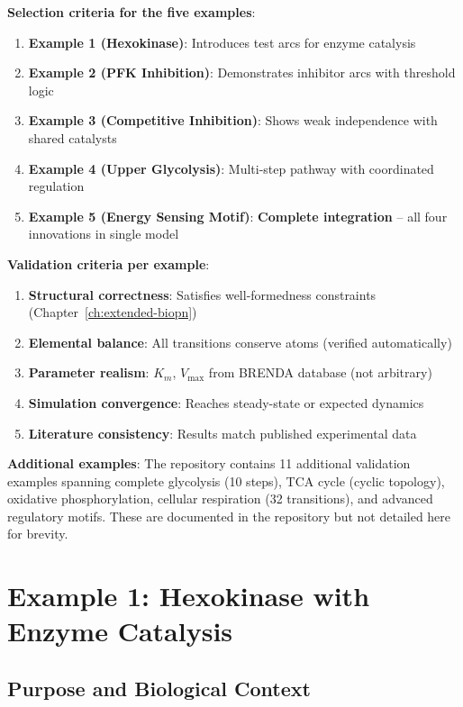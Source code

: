 \textbf{Selection criteria for the five examples}:

\begin{enumerate}
    \item \textbf{Example 1 (Hexokinase)}: Introduces test arcs for enzyme catalysis
    \item \textbf{Example 2 (PFK Inhibition)}: Demonstrates inhibitor arcs with threshold logic
    \item \textbf{Example 3 (Competitive Inhibition)}: Shows weak independence with shared catalysts
    \item \textbf{Example 4 (Upper Glycolysis)}: Multi-step pathway with coordinated regulation
    \item \textbf{Example 5 (Energy Sensing Motif)}: \textbf{Complete integration} -- all four innovations in single model
\end{enumerate}

\textbf{Validation criteria per example}:

\begin{enumerate}
    \item \textbf{Structural correctness}: Satisfies well-formedness constraints (Chapter~\ref{ch:extended-biopn})
    \item \textbf{Elemental balance}: All transitions conserve atoms (verified automatically)
    \item \textbf{Parameter realism}: $K_m$, $V_{\max}$ from BRENDA database (not arbitrary)
    \item \textbf{Simulation convergence}: Reaches steady-state or expected dynamics
    \item \textbf{Literature consistency}: Results match published experimental data
\end{enumerate}

\textbf{Additional examples}: The repository contains 11 additional validation examples spanning complete glycolysis (10 steps), TCA cycle (cyclic topology), oxidative phosphorylation, cellular respiration (32 transitions), and advanced regulatory motifs. These are documented in the repository but not detailed here for brevity.

\section{Example 1: Hexokinase with Enzyme Catalysis}
\label{sec:example-hexokinase}

\subsection{Purpose and Biological Context}
\label{subsec:hex-purpose}

